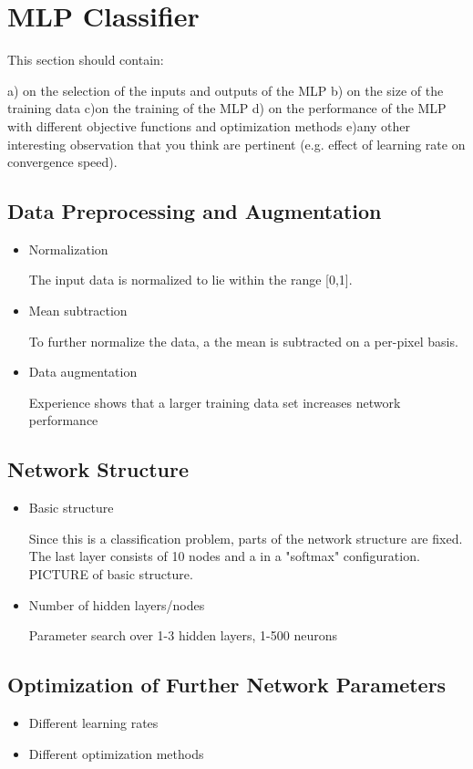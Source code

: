 \section{MLP Classifier}
	    \pagestyle{mario}

This section should contain:

a) on the selection of the inputs and outputs of the MLP
b) on the size of the training data
c)on the training of the MLP
d) on the performance of the MLP with different objective functions and optimization methods
e)any other interesting observation that you think are pertinent (e.g. effect of learning rate on convergence speed).

\subsection{Data Preprocessing and Augmentation}
	    
\begin{itemize}
   	\item Normalization
  	
  	The input data is normalized to lie within the range [0,1].
    	
  	\item Mean subtraction
	    	
   	To further normalize the data, a the mean is subtracted on a per-pixel basis.
	    	
   	\item Data augmentation
	    	
   	Experience shows that a larger training data set increases network performance
\end{itemize}
	    
\subsection{Network Structure}
	    
\begin{itemize}
   	\item Basic structure
	    	
   	Since this is a classification problem, parts of the network structure are fixed. The last layer consists of 10 nodes and a in a "softmax" configuration. PICTURE of basic structure.
	    	
	\item Number of hidden layers/nodes
	    	
	Parameter search over 1-3 hidden layers, 1-500 neurons
	    	
	    	
\end{itemize}
	    
	    
\subsection{Optimization of Further Network Parameters}
	    
\begin{itemize}
   	\item Different learning rates
	    	
   	\item Different optimization methods
\end{itemize}
